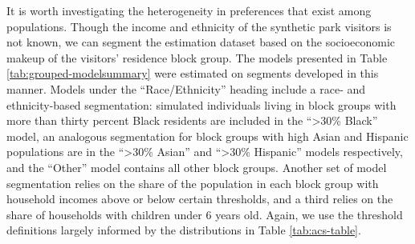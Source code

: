\documentclass[3p, authoryear, review, doubleblind]{elsarticle} %
\begin{document}
It is worth investigating the heterogeneity in preferences that exist among
populations. Though the income and ethnicity of the synthetic park visitors is
not known, we can segment the estimation dataset based on the socioeconomic
makeup of the visitors' residence block group. The models presented in Table
\ref{tab:grouped-modelsummary} were estimated on segments developed in this
manner. Models under the ``Race/Ethnicity'' heading include a race- and
ethnicity-based segmentation: simulated individuals living in block groups with
more than thirty percent Black residents are included in the ``\textgreater30\% Black'' model,
an analogous segmentation for block groups with high Asian and Hispanic
populations are in the ``\textgreater30\% Asian'' and ``\textgreater30\% Hispanic'' models respectively, and
the ``Other'' model contains all other block groups. Another set of model
segmentation relies on the share of the population in each block group with
household incomes above or below certain thresholds, and a third relies on the
share of households with children under 6 years old. Again, we use the threshold
definitions largely informed by the distributions in Table \ref{tab:acs-table}.
\end{document}
